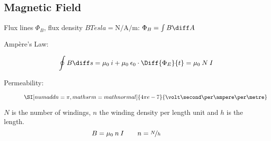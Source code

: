 
\subsection{Magnetic Field} %
	Flux lines $\Phi_B$, flux density $B \unit{Tesla} = \unit{\newton\per\ampere\per\metre}$:
	$
		\Phi_B = \int B \diff A
	$
	
	\begin{description}
		\item[Ampère's Law:] \[
			\oint B \diff s = \mu_0 \: i + \mu_0 \: \epsilon_0 \cdot \Diff{\Phi_E}{t} = \mu_0 \: N \: I
		\]
		\item[Permeability:] $\SI[numaddn=\pi,mathsrm=mathnormal]{4\pi e-7}{\volt\second\per\ampere\per\metre}$
	\end{description}
	
	$N$ is the number of windings, $n$ the winding density per length unit and $h$ is the length.
	\[
		B = \mu_0 \: n\: I \qquad n = \nicefrac{N}{h}
	\]
